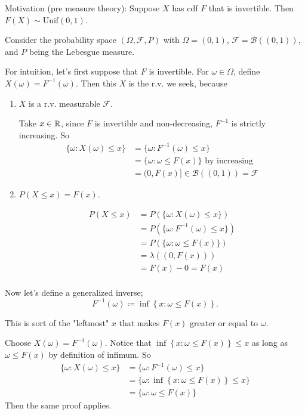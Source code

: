 \documentclass[class=article,crop=false]{standalone}
\begin{document}
\begin{prf}
	Motivation (pre measure theory): Suppose $ X$ has cdf  $ F$ that is invertible. Then  $ F(X) \sim \text{Unif}(0,1)$. 

	Consider the probability space $(\Omega,\mathcal{F},P)$ with $ \Omega=(0,1)$, $ \mathcal{F}=\mathcal{B}((0,1))$, and $ P$ being the Lebesgue measure. 

	For intuition, let's first suppose that  $ F$ is invertible. For  $ \omega \in \Omega$, define $ X(\omega) = F^{-1}(\omega)$. Then this $ X$ is the r.v. we seek, because
	 \begin{enumerate}[label=\arabic*)]
		\item $ X$ is a r.v. measurable  $ \mathcal{F}$.
			
			Take $ x \in \mathbb{R}$, since $ F$ is invertible and non-decreasing, $ F^{-1}$ is strictly increasing. So
\begin{align*}
\{\omega: X(\omega)\leq x\} &= \{\omega: F^{-1}(\omega)\leq x\}  \\
&= \{\omega: \omega \leq F(x)\}  \text{ by increasing} \\
&= (0,F(x)] \in \mathcal{B}((0,1)) =\mathcal{F} 
\end{align*}
		\item $ P(X\leq x) = F(x)$.

			\begin{align*}
				P(X\leq x) &= P(\{\omega:X(\omega)\leq x\} )\\
					    &= P(\{\omega: F^{-1}(\omega) \leq x\} ) \\
					    &= P(\{\omega: \omega\leq F(x)\} ) \\
					    &= \lambda((0,F(x))) \\
					    &= F(x)-0= F(x) \\
			\end{align*}
	\end{enumerate}

	Now let's define a generalized inverse;
	\[
		F^{-1}(\omega) \coloneqq \inf\left\{x: \omega\leq F(x) \right\} 
	.\] 
\begin{intuition}
	This is sort of the "leftmost" $ x$ that makes $ F(x)$ greater or equal to  $ \omega$.
\end{intuition}
Choose $ X(\omega) = F^{-1}(\omega)$. Notice that $ \inf\left\{x:\omega \leq F(x) \right\} \leq x $ as long as $ \omega \leq F(x)$ by definition of infimum. So 
\begin{align*}
	\{\omega: X(\omega) \leq x\} &= \{\omega: F^{-1}(\omega) \leq x \} \\
				     &= \{\omega: \inf\left\{x: \omega \leq F(x) \right\} \leq x \}  \\
	&= \{\omega:\omega\leq F(x)\}  	
\end{align*}
Then the same proof applies.
\end{prf}
\end{document}
